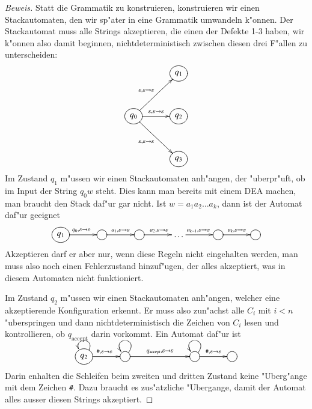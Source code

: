 \begin{proof}[Beweis]
Statt die Grammatik zu konstruieren, konstruieren wir einen Stackautomaten,
den wir sp"ater in eine Grammatik umwandeln k"onnen. Der Stackautomat
muss alle Strings akzeptieren, die einen der Defekte 1-3 haben, wir
k"onnen also damit beginnen, nichtdeterministisch zwischen diesen drei
F"allen zu unterscheiden:
\[
\entrymodifiers={++[o][F]}
\xymatrix @+3mm{
*+\txt{}
	&q_1
\\
q_0	\ar[ur]^{\varepsilon,\varepsilon\to\varepsilon}
	\ar[r]^{\varepsilon,\varepsilon\to\varepsilon}
	\ar[dr]_{\varepsilon,\varepsilon\to\varepsilon}
	&q_2
\\
*+\txt{}
	&q_3
}
\]
Im Zustand $q_1$ m"ussen wir einen Stackautomaten anh"angen, der
"uberpr"uft, ob im Input der String $q_0w$ steht. Dies kann man 
bereits mit einem DEA machen, man braucht den Stack daf"ur gar nicht.
Ist $w=a_1a_2\dots a_k$, dann ist der Automat daf"ur geeignet
\[
\xymatrix @+3mm{
*++[o][F]{q_1}\ar[r]^{q_0,\varepsilon\to\varepsilon}
	&*++[o][F]{}\ar[r]^{a_1,\varepsilon\to\varepsilon}
		&*++[o][F]{}\ar[r]^{a_2,\varepsilon\to\varepsilon}
			&\dots\ar[r]^{a_{k-1},\varepsilon\to\varepsilon}
				&*++[o][F]{}\ar[r]^{a_k,\varepsilon\to\varepsilon}
					&*++[o][F]{}
}
\]
Akzeptieren darf er aber nur, wenn diese Regeln nicht eingehalten
werden, man muss also noch einen Fehlerzustand hinzuf"ugen, der
alles akzeptiert, was in diesem Automaten nicht funktioniert.

Im Zustand $q_2$ m"ussen wir einen Stackautomaten anh"angen, welcher
eine akzeptierende Konfiguration erkennt. Er muss also zun"achst 
alle $C_i$ mit $i<n$ "uberspringen und dann nichtdeterministisch
die Zeichen von $C_i$ lesen und kontrollieren, ob $q_{\text{accept}}$
darin vorkommt. Ein Automat daf"ur ist 
\[
\entrymodifiers={++[o][F]}
\xymatrix @+3mm{
q_2\ar@(ur,ul)
	\ar[r]^{{\tt\#},\varepsilon\to\varepsilon}
	&{}\ar@(ur,ul)
		\ar[rr]^{q_{\text{accept}},\varepsilon\to\varepsilon}
		&*+\txt{}
			&{}\ar@(ur,ul)
				\ar[r]^{{\tt\#},\varepsilon\to\varepsilon}
				&*++[o][F]{}
}
\]
Darin enhalten die Schleifen beim zweiten und dritten Zustand keine
"Uberg"ange mit dem Zeichen {\tt\#}. Dazu braucht es zus"atzliche
"Ubergange, damit der Automat alles ausser diesen Strings akzeptiert.


\end{proof}
